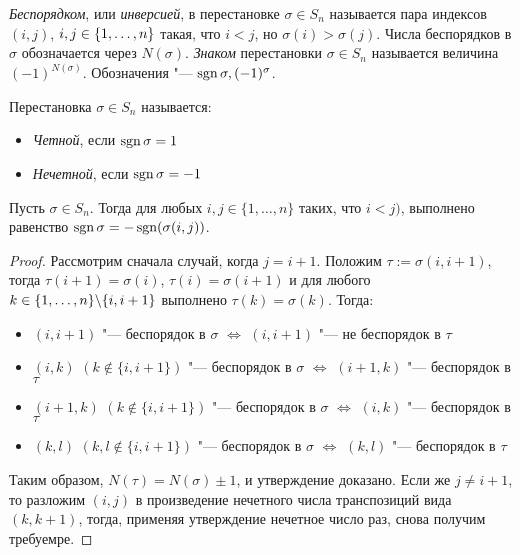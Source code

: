 \begin{definition}
	\textit{Беспорядком}, или \textit{инверсией}, в перестановке $\sigma \in S_n$ называется пара индексов $(i, j)$, $i, j \in \{1, \dotsc, n\}$ такая, что $i < j$, но $\sigma(i) > \sigma(j)$. Числа беспорядков в $\sigma$ обозначается через $N(\sigma)$. \textit{Знаком} перестановки $\sigma \in S_n$ называется величина $(-1)^{N(\sigma)}$. Обозначения "--- $\operatorname{sgn}{\sigma}, (-1)^{\sigma}$.
\end{definition}

\begin{definition}
	Перестановка $\sigma \in S_n$ называется:
	\begin{itemize}
		\item \textit{Четной}, если $\operatorname{sgn}{\sigma} = 1$
		\item \textit{Нечетной}, если $\operatorname{sgn}{\sigma} = -1$
	\end{itemize}
\end{definition}

\begin{proposition}
	Пусть $\sigma \in S_n$. Тогда для любых $i, j \in \{1, \dots, n\}$ таких, что $i < j)$, выполнено равенство $\operatorname{sgn}{\sigma} = -\operatorname{sgn}(\sigma(i, j))$.
\end{proposition}

\begin{proof}
	Рассмотрим сначала случай, когда $j = i + 1$. Положим $\tau := \sigma(i, i + 1)$, тогда $\tau(i + 1) = \sigma(i)$, $\tau(i) = \sigma(i + 1)$ и для любого $k \in \{1, \dotsc, n\} \backslash \{i, i+1\}$ выполнено $\tau(k) = \sigma(k)$. Тогда:
	\begin{itemize}
		\item $(i, i+1)$ "--- беспорядок в $\sigma$ $\Leftrightarrow$ $(i, i+1)$ "--- не беспорядок в $\tau$
		\item $(i, k)$ $(k \not\in \{i, i+1\})$ "--- беспорядок в $\sigma$ $\Leftrightarrow$ $(i + 1, k)$ "--- беспорядок в $\tau$
		\item $(i+1, k)$ $(k \not\in \{i, i+1\})$ "--- беспорядок в $\sigma$ $\Leftrightarrow$ $(i, k)$ "--- беспорядок в $\tau$
		\item $(k, l)$ $(k, l \not\in \{i, i+1\})$ "--- беспорядок в $\sigma$ $\Leftrightarrow$ $(k, l)$ "--- беспорядок в $\tau$
	\end{itemize}

	Таким образом, $N(\tau) = N(\sigma) \pm 1$, и утверждение доказано. Если же $j \ne i + 1$, то разложим $(i, j)$ в произведение нечетного числа транспозиций вида $(k, k + 1)$, тогда, применяя утверждение нечетное число раз, снова получим требуемре.
\end{proof}

